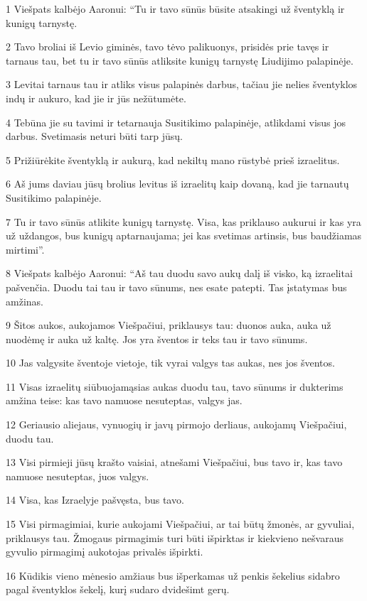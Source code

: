 \par 1 Viešpats kalbėjo Aaronui: “Tu ir tavo sūnūs būsite atsakingi už šventyklą ir kunigų tarnystę. 
\par 2 Tavo broliai iš Levio giminės, tavo tėvo palikuonys, prisidės prie tavęs ir tarnaus tau, bet tu ir tavo sūnūs atliksite kunigų tarnystę Liudijimo palapinėje. 
\par 3 Levitai tarnaus tau ir atliks visus palapinės darbus, tačiau jie nelies šventyklos indų ir aukuro, kad jie ir jūs nežūtumėte. 
\par 4 Tebūna jie su tavimi ir tetarnauja Susitikimo palapinėje, atlikdami visus jos darbus. Svetimasis neturi būti tarp jūsų. 
\par 5 Prižiūrėkite šventyklą ir aukurą, kad nekiltų mano rūstybė prieš izraelitus. 
\par 6 Aš jums daviau jūsų brolius levitus iš izraelitų kaip dovaną, kad jie tarnautų Susitikimo palapinėje. 
\par 7 Tu ir tavo sūnūs atlikite kunigų tarnystę. Visa, kas priklauso aukurui ir kas yra už uždangos, bus kunigų aptarnaujama; jei kas svetimas artinsis, bus baudžiamas mirtimi”. 
\par 8 Viešpats kalbėjo Aaronui: “Aš tau duodu savo aukų dalį iš visko, ką izraelitai pašvenčia. Duodu tai tau ir tavo sūnums, nes esate patepti. Tas įstatymas bus amžinas. 
\par 9 Šitos aukos, aukojamos Viešpačiui, priklausys tau: duonos auka, auka už nuodėmę ir auka už kaltę. Jos yra šventos ir teks tau ir tavo sūnums. 
\par 10 Jas valgysite šventoje vietoje, tik vyrai valgys tas aukas, nes jos šventos. 
\par 11 Visas izraelitų siūbuojamąsias aukas duodu tau, tavo sūnums ir dukterims amžina teise: kas tavo namuose nesuteptas, valgys jas. 
\par 12 Geriausio aliejaus, vynuogių ir javų pirmojo derliaus, aukojamų Viešpačiui, duodu tau. 
\par 13 Visi pirmieji jūsų krašto vaisiai, atnešami Viešpačiui, bus tavo ir, kas tavo namuose nesuteptas, juos valgys. 
\par 14 Visa, kas Izraelyje pašvęsta, bus tavo. 
\par 15 Visi pirmagimiai, kurie aukojami Viešpačiui, ar tai būtų žmonės, ar gyvuliai, priklausys tau. Žmogaus pirmagimis turi būti išpirktas ir kiekvieno nešvaraus gyvulio pirmagimį aukotojas privalės išpirkti. 
\par 16 Kūdikis vieno mėnesio amžiaus bus išperkamas už penkis šekelius sidabro pagal šventyklos šekelį, kurį sudaro dvidešimt gerų. 

